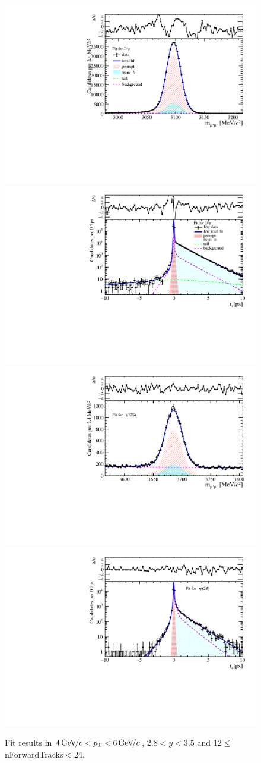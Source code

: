 \begin{figure}[H]
\begin{center}
\includegraphics[width=0.47\linewidth]{pdf/Jpsi/drawmassF/n2y2pt3.pdf}
\includegraphics[width=0.47\linewidth]{pdf/Jpsi/2DFitF/n2y2pt3.pdf}
\vspace*{-0.5cm}
\includegraphics[width=0.47\linewidth]{pdf/Psi2S/drawmassF/n2y2pt3.pdf}
\includegraphics[width=0.47\linewidth]{pdf/Psi2S/2DFitF/n2y2pt3.pdf}
\vspace*{-0.5cm}
\end{center}
\caption{Fit results in $4\text{\,Ge\kern -0.1em V\!/}c<p_{\mathrm{T}}<6\text{\,Ge\kern -0.1em V\!/}c$, $2.8<y<3.5$ and 12$\leq$nForwardTracks$<$24.}
\label{Fitn2y2pt3}
\end{figure}
